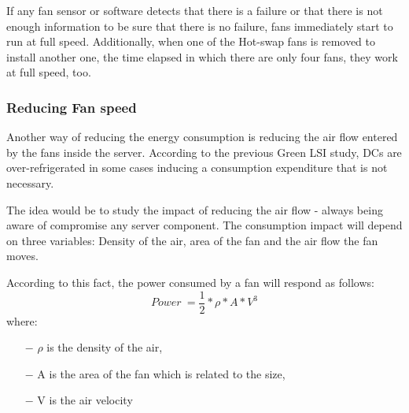     \begin{comment}
    Additionally, related to the revolutions per minute (RPM) they can achieve, they have a maximum and a minimum cap:
    
\begin{itemize}
    \item[$-$] All the fans have a minimum RPM which is 6000 RPM. Regardless of the status of the server - idle, full-load, middle-load - fans cannot run at a lower speed.
    \item[$-$] The maximum speed that fans can achieve is 12.500 RPM which is an
    information obtained from the datasheet.
\end{itemize}
    \end{comment}


If any fan sensor or software detects that there is a failure or that there is not enough information to be sure that there is no failure, fans immediately start to run at full speed. Additionally, when one of the Hot-swap fans is removed to install another one, the time elapsed in which there are only four fans, they work at full speed, too.

\subsubsection{Reducing Fan speed}


Another way of reducing the energy consumption is reducing the air flow entered by the fans inside the server. According to the previous Green LSI study, DCs are over-refrigerated in some cases inducing a consumption expenditure that is not necessary.

The idea would be to study the impact of reducing the air flow - always being aware of compromise any server component. The consumption impact will depend on three variables: Density of the air, area of the fan and the air flow the fan moves.

According to this fact, the power consumed by a fan will respond as follows:
\begin{equation*}\label{eq:1}
Power\ = \frac{1}{2} * \rho * A * {V}^{3}
\end{equation*}
where:
\begin{itemize}
    \item[$-$] $\rho$ is the density of the air,
    \item[$-$] A is the area of the fan which is related to the size,
    \item[$-$] V is the air velocity
\end{itemize}

